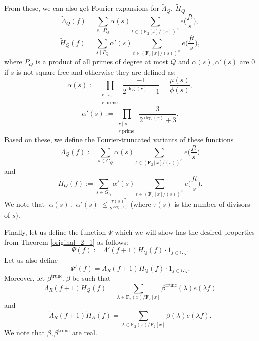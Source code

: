 \documentclass[11pt, reqno]{amsart}
\numberwithin{equation}{section}
\newcommand{\zff}{\mathbf{F}_2[x]}
\newcommand{\zffmi}[1]{(\zff/(#1))^{\times}}
\newcommand{\zffmodinvs}{\zffmi{s}}
\newcommand{\betatrunc}{\beta^{\trunc}}
\newcommand\trunc{\operatorname{trunc}}
\newcommand\pprime{\operatorname{prime}}
\begin{document}
From these, we can also get Fourier expansions for $\widetilde{\Lambda}_Q, \ \widetilde{H}_Q$
\begin{equation}
\label{lambda_tilde}
    \widetilde{\Lambda}_Q(f) = \sum_{s \mid P_Q} \alpha
(s) \sum_{t \in \zffmodinvs} e\Big(\frac{ft}{s}\Big),
\end{equation}
\begin{equation}
\label{h_tilde}
    \widetilde{H}_Q(f) = \sum_{s \mid P_Q} \alpha'
(s) \sum_{t \in \zffmodinvs} e\Big(\frac{ft}{s}\Big),
\end{equation}
where $P_Q$ is a product of all primes of degree at most $Q$ and $\alpha(s), \alpha'(s)$ are $0$ if $s$ is not square-free and otherwise they are defined as:
\begin{equation}
\label{alpha}
    \alpha(s):=\prod_{\substack{r \mid s, \\ r \pprime}} \frac{-1}{2^{\deg(r)} - 1}=\frac{\mu(s)}{\phi(s)},
\end{equation}
\begin{equation}
\label{alpha_prime}
    \alpha'(s):=\prod_{\substack{r \mid s, \\ r \pprime}} \frac{3}{2^{\deg(r)} + 3}.
\end{equation}
Based on these, we define the Fourier-truncated variants of these functions
\begin{equation}
\label{lambda_def}
    \Lambda_Q(f) := \sum_{s \in G_Q} \alpha(s) \sum_{t \in \zffmodinvs} e\Big(\frac{ft}{s}\Big)
\end{equation}
and
\begin{equation}
\label{h_def}
    H_Q(f) := \sum_{s \in G_Q} \alpha'(s) \sum_{t \in \zffmodinvs} e\Big(\frac{ft}{s}\Big).
\end{equation}
We note that $|\alpha(s)|, |\alpha'(s)| \leqslant \frac{\tau(s)^2}{2^{\deg(s)}}$ (where $\tau(s)$ is the number of divisors of $s$).

Finally, let us define the function $\Psi$ which we will show has the desired properties from Theorem \ref{original_2_1} as follows:
\begin{equation}
\label{psi_def}
    \Psi(f) := \Lambda'(f+1)H_Q(f) \cdot 1_{f \in G_N}.
\end{equation}
Let us also define
\begin{equation}
\label{psi_prime_def}
    \Psi'(f)=\Lambda_R(f+1)H_Q(f) \cdot 1_{f \in G_N}.
\end{equation}
Moreover, let $\beta^{\trunc}, \beta$ be such that
\begin{equation}
\label{beta_trunc_def}
    \Lambda_R(f+1)H_Q(f)=\sum_{\lambda \in \mathbf{F}_2(x) / \mathbf{F}_2[x]}\beta^{\trunc}(\lambda)e(\lambda f)
\end{equation}
and
\begin{equation}
\label{beta_def}
    \widetilde{\Lambda}_R(f+1)\widetilde{H}_R(f)=\sum_{\lambda \in \mathbf{F}_2(x) / \mathbf{F}_2[x]} \beta(\lambda)e(\lambda f).
\end{equation}
We note that $\beta, \betatrunc$ are real.
\end{document}
